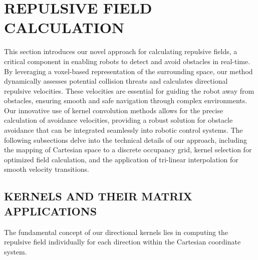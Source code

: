 \documentclass[letterpaper, 10 pt, conference]{ieeeconf}  %
\begin{document}
\section{REPULSIVE FIELD CALCULATION}
\label{section:repulsive_vel}

This section introduces our novel approach for calculating repulsive fields, a critical component in enabling robots to detect and avoid obstacles in real-time. By leveraging a voxel-based representation of the surrounding space, our method dynamically assesses potential collision threats and calculates directional repulsive velocities. These velocities are essential for guiding the robot away from obstacles, ensuring smooth and safe navigation through complex environments. Our innovative use of kernel convolution methods allows for the precise calculation of avoidance velocities, providing a robust solution for obstacle avoidance that can be integrated seamlessly into robotic control systems. The following subsections delve into the technical details of our approach, including the mapping of Cartesian space to a discrete occupancy grid, kernel selection for optimized field calculation, and the application of tri-linear interpolation for smooth velocity transitions. 



\subsection{KERNELS AND THEIR MATRIX APPLICATIONS}

The fundamental concept of our directional kernels lies in computing the repulsive field individually for each direction within the Cartesian coordinate system. 
\end{document}

